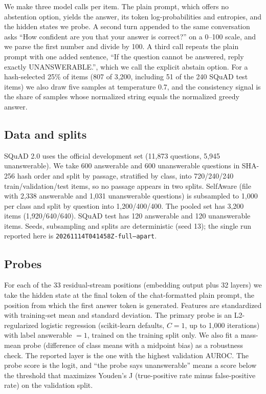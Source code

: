 \documentclass[10pt]{article}
\newcommand{\code}[1]{\texttt{#1}}
\begin{document}
We make three model calls per item. The plain prompt, which offers no abstention option, yields the answer, its token log-probabilities and entropies, and the hidden states we probe. A second turn appended to the same conversation asks ``How confident are you that your answer is correct?'' on a 0--100 scale, and we parse the first number and divide by 100. A third call repeats the plain prompt with one added sentence, ``If the question cannot be answered, reply exactly UNANSWERABLE.'', which we call the explicit abstain option. For a hash-selected 25\% of items (807 of 3,200, including 51 of the 240 SQuAD test items) we also draw five samples at temperature 0.7, and the consistency signal is the share of samples whose normalized string equals the normalized greedy answer.

\subsection{Data and splits}
SQuAD 2.0 uses the official development set (11,873 questions, 5,945 unanswerable). We take 600 answerable and 600 unanswerable questions in SHA-256 hash order and split by passage, stratified by class, into 720/240/240 train/validation/test items, so no passage appears in two splits. SelfAware (file with 2,338 answerable and 1,031 unanswerable questions) is subsampled to 1,000 per class and split by question into 1,200/400/400. The pooled set has 3,200 items (1,920/640/640). SQuAD test has 120 answerable and 120 unanswerable items. Seeds, subsampling and splits are deterministic (seed 13); the single run reported here is \code{20261114T041458Z-full--apart}.

\subsection{Probes}
For each of the 33 residual-stream positions (embedding output plus 32 layers) we take the hidden state at the final token of the chat-formatted plain prompt, the position from which the first answer token is generated. Features are standardized with training-set mean and standard deviation. The primary probe is an L2-regularized logistic regression (scikit-learn defaults, $C=1$, up to 1,000 iterations) with label answerable $=1$, trained on the training split only. We also fit a mass-mean probe (difference of class means with a midpoint bias) as a robustness check. The reported layer is the one with the highest validation AUROC. The probe score is the logit, and ``the probe says unanswerable'' means a score below the threshold that maximizes Youden's J (true-positive rate minus false-positive rate) on the validation split.
\end{document}
